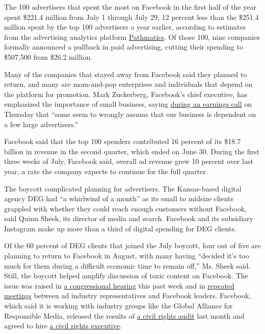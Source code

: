 The 100 advertisers that spent the most on Facebook in the first half of
the year spent \$221.4 million from July 1 through July 29, 12 percent
less than the \$251.4 million spent by the top 100 advertisers a year
earlier, according to estimates from the advertising analytics platform
\href{https://www.pathmatics.com/product/methodology}{Pathmatics}. Of
those 100, nine companies formally announced a pullback in paid
advertising, cutting their spending to \$507,500 from \$26.2 million.

Many of the companies that stayed away from Facebook said they planned
to return, and many are mom-and-pop enterprises and individuals that
depend on the platform for promotion. Mark Zuckerberg, Facebook's chief
executive, has emphasized the importance of small business, saying
\href{https://www.nytimes3xbfgragh.onion/live/2020/07/30/business/stock-market-today-coronavirus\#facebook-nearly-doubles-its-profit-but-warns-of-fallout-from-ad-boycottshttps://www.nytimes3xbfgragh.onion/2020/07/30/technology/tech-company-earnings-amazon-apple-facebook-google.html}{during
an earnings call} on Thursday that ``some seem to wrongly assume that
our business is dependent on a few large advertisers.''

Facebook said that the top 100 spenders contributed 16 percent of its
\$18.7 billion in revenue in the second quarter, which ended on June 30.
During the first three weeks of July, Facebook said, overall ad revenue
grew 10 percent over last year, a rate the company expects to continue
for the full quarter.

The boycott complicated planning for advertisers. The Kansas-based
digital agency DEG had ``a whirlwind of a month'' as its small to
midsize clients grappled with whether they could reach enough customers
without Facebook, said Quinn Sheek, its director of media and search.
Facebook and its subsidiary Instagram make up more than a third of
digital spending for DEG clients.

Of the 60 percent of DEG clients that joined the July boycott, four out
of five are planning to return to Facebook in August, with many having
``decided it's too much for them during a difficult economic time to
remain off,'' Ms. Sheek said. Still, the boycott helped amplify
discussion of toxic content on Facebook. The issue was raised in
\href{https://www.nytimes3xbfgragh.onion/2020/07/29/technology/big-tech-hearing-apple-amazon-facebook-google.html}{a
congressional hearing} this past week and in
\href{https://www.nytimes3xbfgragh.onion/2020/06/23/business/media/facebook-ad-boycott.html}{repeated
meetings} between ad industry representatives and Facebook leaders.
Facebook, which said it is working with industry groups like the Global
Alliance for Responsible Media, released the results of
\href{https://www.nytimes3xbfgragh.onion/2020/07/08/technology/facebook-civil-rights-audit.html}{a
civil rights audit} last month and agreed to hire
\href{https://www.nytimes3xbfgragh.onion/2020/07/07/technology/facebook-ad-boycott-civil-rights.html}{a
civil rights executive}.

